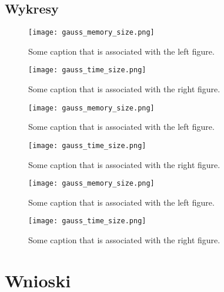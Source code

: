 \documentclass[11pt]{article}
\begin{document}
\begin{flushleft}
\subsection{Wykresy}
\begin{figure}[!htbp]
  \begin{minipage}[b]{.45\textwidth}
    \centering
    \texttt{[image: gauss\_memory\_size.png]}
    \caption{Some caption that is associated with the left figure.}
  \end{minipage}\hfill
  \begin{minipage}[b]{.45\textwidth}
    \centering
    \texttt{[image: gauss\_time\_size.png]}
    \caption{Some caption that is associated with the right figure.}
  \end{minipage}
  \begin{minipage}[b]{.45\textwidth}
    \centering
    \texttt{[image: gauss\_memory\_size.png]}
    \caption{Some caption that is associated with the left figure.}
  \end{minipage}\hfill
  \begin{minipage}[b]{.45\textwidth}
    \centering
    \texttt{[image: gauss\_time\_size.png]}
    \caption{Some caption that is associated with the right figure.}
  \end{minipage}
  \begin{minipage}[b]{.45\textwidth}
    \centering
    \texttt{[image: gauss\_memory\_size.png]}
    \caption{Some caption that is associated with the left figure.}
  \end{minipage}\hfill
  \begin{minipage}[b]{.45\textwidth}
    \centering
    \texttt{[image: gauss\_time\_size.png]}
    \caption{Some caption that is associated with the right figure.}
  \end{minipage}
\end{figure}
\newpage
\section{Wnioski}
\end{flushleft}
\end{document}
